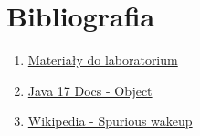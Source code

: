 \documentclass[11pt]{article}
\providecommand{\tightlist}{%
      \setlength{\itemsep}{0pt}\setlength{\parskip}{0pt}}
\begin{document}
    \hypertarget{bibliografia}{%
\section{Bibliografia}\label{bibliografia}}

\begin{enumerate}
\def\labelenumi{\arabic{enumi}.}
\tightlist
\item
  \href{https://home.agh.edu.pl/~funika/tw/lab2/}{Materiały do
  laboratorium}
\item
  \href{https://docs.oracle.com/en/java/javase/17/docs/api/java.base/java/lang/Object.html}{Java
  17 Docs - Object}
\item
  \href{https://en.wikipedia.org/wiki/Spurious_wakeup}{Wikipedia -
  Spurious wakeup}
\end{enumerate}


    
    
    
\end{document}
